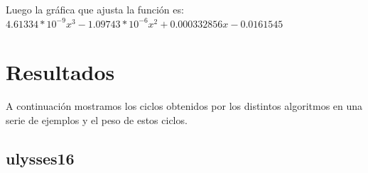 \documentclass[a4]{article}
\begin{document}
Luego la gráfica que ajusta la función es: $4.61334*10^{-9}x^3 - 1.09743*10^{-6}x^2 + 0.000332856x - 0.0161545 $ 

\begin{figure}[H]
  \centering
{}
\end{figure}

\section{Resultados}

A continuación mostramos los ciclos obtenidos por los distintos
algoritmos en una serie de ejemplos y el peso de estos ciclos.

\subsection{ulysses16}
\end{document}
